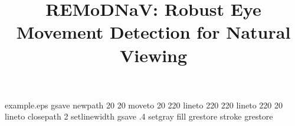 %
%
%
%
%
\begin{filecontents*}{example.eps}
    gsave
    newpath
    20 20 moveto
    20 220 lineto
    220 220 lineto
    220 20 lineto
    closepath
    2 setlinewidth
    gsave
    .4 setgray fill
    grestore
    stroke
    grestore
\end{filecontents*}
%
\RequirePackage{fix-cm}
%
\documentclass[smallextended,twocolumn]{svjour3}          %
%
\smartqed  %
%
\usepackage{graphicx}
%
%
\usepackage{natbib}


\usepackage{amsmath}
\usepackage{textcomp}
\usepackage{booktabs}
\usepackage{units}
\usepackage[draft]{hyperref} %
\usepackage{wrapfig}
\usepackage{todonotes}
\newcommand{\eg}{e.g., }
\newcommand{\ie}{i.e., }
\newcommand{\remodnav}{REMoDNaV}
\newcommand{\fig}[1]{{Figure~\ref{fig:#1}}}
\newcommand{\tab}[1]{{Table~\ref{tab:#1}}}
\newcommand{\param}[1]{{\texttt{#1}}}





\onecolumn
\title{REMoDNaV: Robust Eye Movement Detection for Natural Viewing } %



